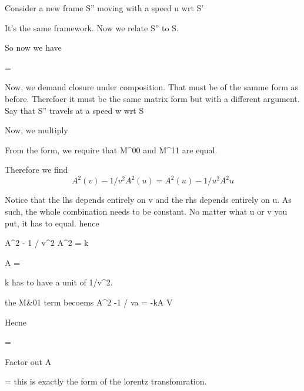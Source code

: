 Consider a new frame S'' moving with a speed u wrt S' 

It's the same framework. Now we relate S'' to S.

So now we have

= 

Now, we demand closure under composition. That must be of the samme form as before. 
Therefoer it must be the same matrix form but with a different argument. Say that S'' travels at a speed w wrt S

Now, we multiply

From the form, we require that M^{00} and M^{11} are equal.

Therefore we find
\begin{equation}
    A^2(v) - 1 / v^2 A^2(u) = A^2(u) - 1 / u^2 A^2 u
\end{equation}

Notice that the lhs depends entirely on v and the rhs depends entirely on u. As such, the whole combination needs to be constant. No matter
what u or v you put, it has to equal. hence

A^2  - 1 / v^2 A^2 = k

A =  

k has to have a unit of 1/v^2. 

the M&{01} term becoems A^2 -1 / va = -kA V

Hecne

=

Factor out A

=
this is exactly the form of the lorentz transfomration.

